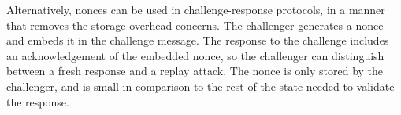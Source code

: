 Alternatively, nonces can be used in challenge-response protocols, in a manner
that removes the storage overhead concerns. The challenger generates a nonce
and embeds it in the challenge message. The response to the challenge includes
an acknowledgement of the embedded nonce, so the challenger can distinguish
between a fresh response and a replay attack. The nonce is only stored by the
challenger, and is small in comparison to the rest of the state needed to
validate the response.
